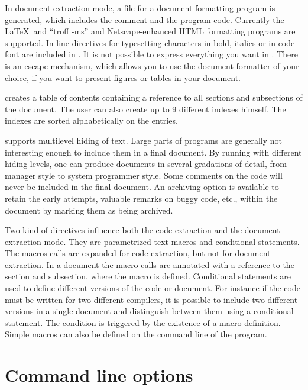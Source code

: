 \documentclass{article}
\begin{document}
In document extraction mode, a file for a document formatting program
is generated, which includes the comment and the program code.
Currently the \LaTeX\ and ``troff -ms'' and Netscape-enhanced HTML 
formatting programs are supported. 
In-line directives for typesetting characters in bold,
italics or in code font are included in \Mx. It is not possible to
express everything you want in \Mx. There is an escape mechanism,
which allows you to use the document formatter of your choice, if you
want to present figures or tables in your document.

\Mx creates a table of contents containing a reference to all sections
and subsections of the document. The user can also create up to 9
different indexes himself. The indexes are sorted
alphabetically on the entries.

\Mx supports multilevel hiding of text. Large parts of
programs are generally not interesting enough to include them in a
final document. By running \Mx with different
hiding levels, one can produce documents in several gradations of
detail, from manager style to system programmer style.
Some comments on the code will never be included in the final
document. An archiving option is available to retain the early
attempts, valuable remarks on buggy code, etc.,  
within the \Mx document by marking them as being archived.

Two kind of directives influence both the code extraction and the
document extraction mode. They are parametrized text macros and 
conditional statements. The macros calls are expanded for code extraction,
but not for document extraction. In a document the macro calls are
annotated with a reference to the section and subsection, where
the macro is defined.
Conditional statements are used to define different versions of the
code or document. For instance if the code must be written for two
different compilers, it is possible to include two different versions
in a single document and distinguish between them using a conditional
statement. The condition is triggered by the existence of a macro
definition. Simple macros can also be defined on the command line of
the \Mx program. 

\newpage
\section{Command line options}
\newcommand{\macro}{{$<${\it macro}$>$}}
\newcommand{\file}{{$<${\it file}$>$}}
\newcommand{\text}{{$<${\it text}$>$}}
\newcommand{\mxfile}{{\file{\bf .mx}}}
\newcommand{\example}[2]{
	\begin{table}
	\begin{tabular}{|lp{0.5 \linewidth}|}\hline #2 \hline \end{tabular}
	\caption{#1}
	\end{table}}
\newcommand{\n}{$<n>$}
\end{document}
